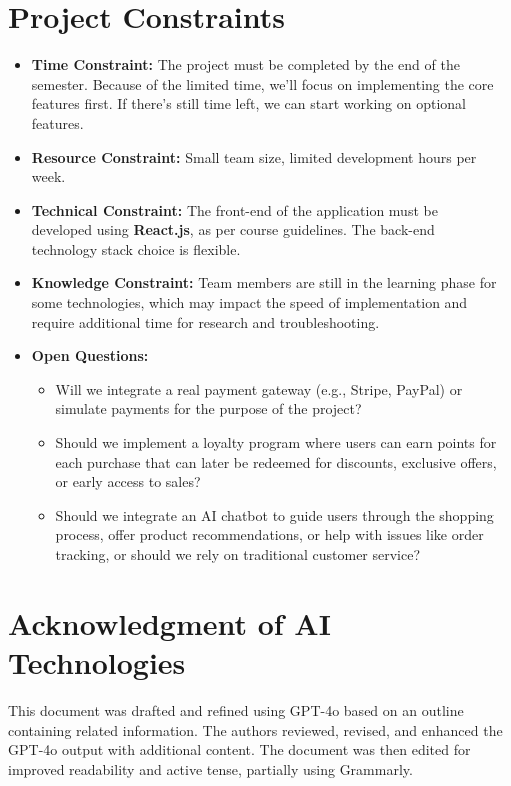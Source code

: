 \documentclass[a4paper,12pt]{article}
\begin{document}
\section{Project Constraints}
	\begin{itemize}
		\item \textbf{Time Constraint:}  The project must be completed by the end of the semester.
		Because of the limited time, we'll focus on implementing the core features first. If there's
		still time left, we can start working on optional features.
		\item \textbf{Resource Constraint:} Small team size, limited development hours per week.
		\item \textbf{Technical Constraint:} The front-end of the application must be \\ developed using
		\textbf{React.js}, as per course guidelines. The back-end \\ technology stack choice is flexible.
		\item \textbf{Knowledge Constraint:} Team members are still in the learning phase for some
		technologies, which may impact the speed of implementation and require additional time for
		research and troubleshooting.
		\item \textbf{Open Questions:}
		\begin{itemize}
			\item Will we integrate a real payment gateway (e.g., Stripe, PayPal) or simulate payments
			for the purpose of the project?
			\item Should we implement a loyalty program where users can earn points for each purchase
			that can later be redeemed for discounts, exclusive offers, or early access to sales?
			\item Should we integrate an AI chatbot to guide users through the shopping process, offer
			product recommendations, or help with issues like order tracking, or should we rely on
			traditional customer service?
		\end{itemize}
	\end{itemize}

\section{Acknowledgment of AI Technologies}
	This document was drafted and refined using GPT-4o based on an outline containing related information. The authors reviewed, revised, and enhanced the GPT-4o output with additional content. The document was then edited for improved readability and active tense, partially using Grammarly.
\end{document}
